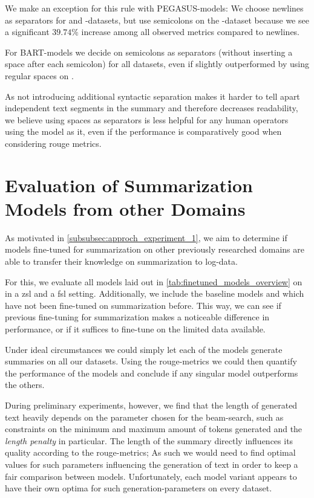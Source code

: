 We make an exception for this rule with PEGASUS-models:
We choose newlines as separators for \logsummary{} and \telco{}-datasets,
but use semicolons on the \hadoop{}-dataset
because we see a significant \(39.74\%\) increase among all observed metrics compared to newlines.

For BART-models we decide on semicolons as separators (without inserting a space after each semicolon)
for all datasets, even if slightly outperformed by using regular spaces on \telco{}.

As not introducing additional syntactic separation makes it harder to tell apart independent text segments in the summary
and therefore decreases readability,
we believe using spaces as separators is less helpful for any human operators using the model as it,
even if the performance is comparatively good when considering \acs*{rouge} metrics.

\section{Evaluation of Summarization Models from other Domains}\label{sec:evaluation_experiment_finetuned}

As motivated in \autoref{subsubsec:approch_experiment_1},
we aim to determine if models fine-tuned for summarization on other previously researched domains
are able to transfer their knowledge on summarization to log-data.

For this, we evaluate all models laid out in \autoref{tab:finetuned_models_overview}
on 
in a \ac{zsl} and a \ac{fsl} setting.
Additionally, we include the baseline models  and 
which have not been fine-tuned on summarization before.
This way, we can see if previous fine-tuning for summarization makes a noticeable difference in performance,
or if it suffices to fine-tune on the limited data available.

Under ideal circumstances we could simply let each of the models generate summaries on all our datasets.
Using the \acs*{rouge}-metrics we could then quantify the performance of the models
and conclude if any singular model outperforms the others.

During preliminary experiments, however, we find that the length of generated text heavily
depends on the parameter chosen for the beam-search,
such as constraints on the minimum and maximum amount of tokens generated
and the \emph{length penalty} in particular.
The length of the summary directly influences its quality according to the \acs*{rouge}-metrics;
As such we would need to find optimal values for such parameters influencing the generation of text
in order to keep a fair comparison between models.
Unfortunately, each model variant appears to have their own optima for such generation-parameters on every dataset.

